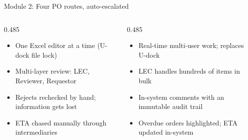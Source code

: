 \begin{frame}{Module 2: Four PO routes, auto-escalated}
    \begin{columns}[T]
        \begin{column}{0.485\textwidth}
            \begin{beforebox}
                {\fontsize{7.5}{10}\selectfont\color{darkslate}
                \begin{itemize}\setlength{\itemsep}{2pt}\setlength{\leftmargin}{10pt}
                    \item[\textcolor{problemtext}{\textbullet}] One Excel editor at a time (U-dock file lock)
                    \item[\textcolor{problemtext}{\textbullet}] Multi-layer review: LEC, Reviewer, Requestor
                    \item[\textcolor{problemtext}{\textbullet}] Rejects rechecked by hand; information gets lost
                    \item[\textcolor{problemtext}{\textbullet}] ETA chased manually through intermediaries
                \end{itemize}
                }
            \end{beforebox}
        \end{column}
        
        \begin{column}{0.485\textwidth}
            \begin{afterbox}
                {\fontsize{7.5}{10}\selectfont\color{darkslate}
                \begin{itemize}\setlength{\itemsep}{2pt}\setlength{\leftmargin}{10pt}
                    \item[\textcolor{primary}{\textbullet}] Real-time multi-user work; replaces U-dock
                    \item[\textcolor{primary}{\textbullet}] LEC handles hundreds of items in bulk
                    \item[\textcolor{primary}{\textbullet}] In-system comments with an immutable audit trail
                    \item[\textcolor{primary}{\textbullet}] Overdue orders highlighted; ETA updated in-system
                \end{itemize}
                }
            \end{afterbox}
        \end{column}
    \end{columns}
\end{frame}
